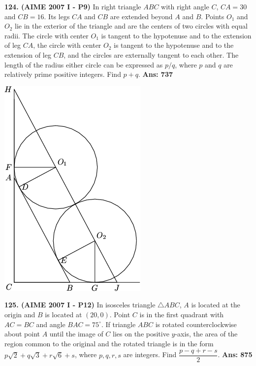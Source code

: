 \documentclass[letterpaper,10pt,addpoints]{exam}
\begin{document}
\textbf{124. (AIME 2007 I - P9) }   In right triangle $ABC$ with right angle $C$, $CA = 30$ and $CB = 16$. Its legs $CA$ and $CB$ are extended beyond $A$ and $B$. Points $O_1$ and $O_2$ lie in the exterior of the triangle and are the centers of two circles with equal radii. The circle with center $O_1$ is tangent to the hypotenuse and to the extension of leg $CA$, the circle with center $O_2$ is tangent to the hypotenuse and to the extension of leg $CB$, and the circles are externally tangent to each other. The length of the radius either circle can be expressed as $p/q$, where $p$ and $q$ are relatively prime positive integers. Find $p+q$.  \quad\textbf{Ans: 737}

\begin{center}
\includegraphics[scale=0.3]{AIME_I_2007-9.png}
\end{center}

\textbf{125. (AIME 2007 I - P12) }   In isosceles triangle $\triangle ABC$, $A$ is located at the origin and $B$ is located at $(20,0)$. Point $C$ is in the first quadrant with $AC = BC$ and angle $BAC = 75^{\circ}$. If triangle $ABC$ is rotated counterclockwise about point $A$ until the image of $C$ lies on the positive $y$-axis, the area of the region common to the original and the rotated triangle is in the form $p\sqrt{2} + q\sqrt{3} + r\sqrt{6} + s$, where $p,q,r,s$ are integers. Find $\dfrac{p-q+r-s}2$. \quad\textbf{Ans: 875}
\end{document}
